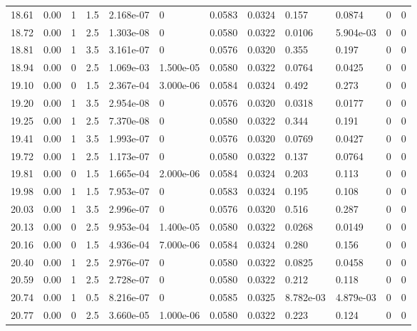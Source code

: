 \documentclass[preview]{standalone}
\begin{document}
{{{{\begin{tabular}{L{1.2cm}C{1.2cm} C{0.3cm}C{0.5cm} C{1.4cm}C{1.4cm} C{1.4cm}C{1.4cm} C{1.6cm}C{1.6cm} C{1.6cm}C{1.6cm}}
  18.61  &  0.00  & 1     & 1.5 &  2.168e-07  & 0  &  0.0583&   0.0324& 0.157 & 0.0874   &  0 & 0  \\ 
  18.72  &  0.00  & 1     & 2.5 &  1.303e-08  & 0  &  0.0580&   0.0322& 0.0106 & 5.904e-03   &  0 & 0  \\ 
  18.81  &  0.00  & 1     & 3.5 &  3.161e-07  & 0  &  0.0576&   0.0320& 0.355 & 0.197   &  0 & 0  \\ 
  18.94  &  0.00  & 0     & 2.5 &  1.069e-03  & 1.500e-05  &  0.0580&   0.0322& 0.0764 & 0.0425   &  0 & 0  \\ 
  19.10  &  0.00  & 0     & 1.5 &  2.367e-04  & 3.000e-06  &  0.0584&   0.0324& 0.492 & 0.273   &  0 & 0  \\ 
  19.20  &  0.00  & 1     & 3.5 &  2.954e-08  & 0  &  0.0576&   0.0320& 0.0318 & 0.0177   &  0 & 0  \\ 
  19.25  &  0.00  & 1     & 2.5 &  7.370e-08  & 0  &  0.0580&   0.0322& 0.344 & 0.191   &  0 & 0  \\ 
  19.41  &  0.00  & 1     & 3.5 &  1.993e-07  & 0  &  0.0576&   0.0320& 0.0769 & 0.0427   &  0 & 0  \\ 
  19.72  &  0.00  & 1     & 2.5 &  1.173e-07  & 0  &  0.0580&   0.0322& 0.137 & 0.0764   &  0 & 0  \\ 
  19.81  &  0.00  & 0     & 1.5 &  1.665e-04  & 2.000e-06  &  0.0584&   0.0324& 0.203 & 0.113   &  0 & 0  \\ 
  19.98  &  0.00  & 1     & 1.5 &  7.953e-07  & 0  &  0.0583&   0.0324& 0.195 & 0.108   &  0 & 0  \\ 
  20.03  &  0.00  & 1     & 3.5 &  2.996e-07  & 0  &  0.0576&   0.0320& 0.516 & 0.287   &  0 & 0  \\ 
  20.13  &  0.00  & 0     & 2.5 &  9.953e-04  & 1.400e-05  &  0.0580&   0.0322& 0.0268 & 0.0149   &  0 & 0  \\ 
  20.16  &  0.00  & 0     & 1.5 &  4.936e-04  & 7.000e-06  &  0.0584&   0.0324& 0.280 & 0.156   &  0 & 0  \\ 
  20.40  &  0.00  & 1     & 2.5 &  2.976e-07  & 0  &  0.0580&   0.0322& 0.0825 & 0.0458   &  0 & 0  \\ 
  20.59  &  0.00  & 1     & 2.5 &  2.728e-07  & 0  &  0.0580&   0.0322& 0.212 & 0.118   &  0 & 0  \\ 
  20.74  &  0.00  & 1     & 0.5 &  8.216e-07  & 0  &  0.0585&   0.0325& 8.782e-03 & 4.879e-03   &  0 & 0  \\ 
  20.77  &  0.00  & 0     & 2.5 &  3.660e-05  & 1.000e-06  &  0.0580&   0.0322& 0.223 & 0.124   &  0 & 0  \\ 

\end{tabular}}}}}
\end{document}

